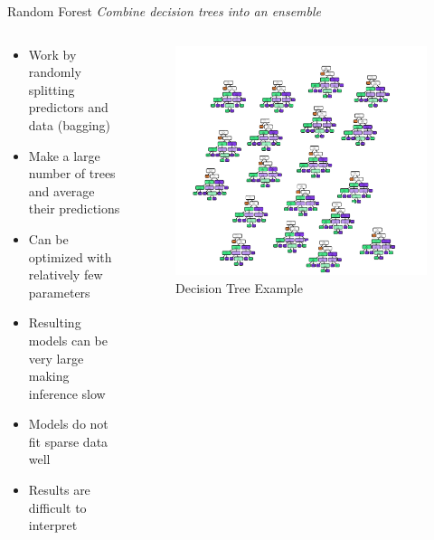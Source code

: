 \documentclass[10pt]{beamer}
\begin{document}
\begin{frame}{Random Forest}
\emph{Combine decision trees into an ensemble}
	\begin{columns}
	\begin{column}{0.5\textwidth}
	\begin{itemize}
		\item Work by randomly splitting predictors and data (bagging)
		\item Make a large number of trees and average their predictions
		\item Can be optimized with relatively few parameters
		\item Resulting models can be very large making inference slow
		\item Models do not fit sparse data well
		\item Results are difficult to interpret
	\end{itemize}
	\end{column}
	\begin{column}{0.5\textwidth}
		\begin{figure}
			\caption{Decision Tree Example}
			\includegraphics[width=1.0\textwidth, center, trim=1cm 0cm 0 0cm]{images/Random_forest.pdf}
	\end{figure}
	\end{column}
	\end{columns}
\end{frame}
\end{document}
